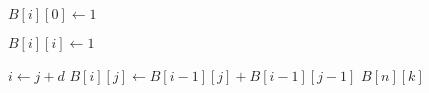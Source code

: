 
\begin{algorithm}[H]
  \begin{algorithmic}[1]
     
	\State $B[i][0] \gets 1$
      \EndFor

	\State $B[i][i] \gets 1$
      \EndFor

	  \State $i \gets j + d$
	  \State $B[i][j] \gets B[i-1][j] + B[i-1][j-1]$
	\EndFor
      \EndFor
      \State \Return $B[n][k]$
    \EndProcedure
  \end{algorithmic}
\end{algorithm}
